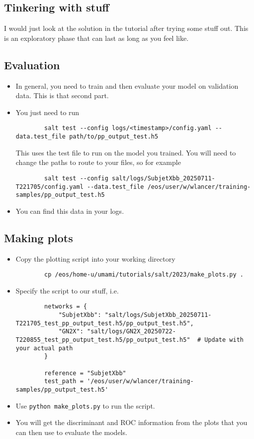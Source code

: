 \documentclass[11pt]{article}
\begin{document}
\subsection{Tinkering with stuff}

I would just look at the solution in the tutorial after trying 
some stuff out. This is an exploratory phase that can last as long
as you feel like.

\subsection{Evaluation}

\begin{itemize}
    \item In general, you need to train and then evaluate your model on validation
    data. This is that second part.
    \item You just need to run
    \begin{verbatim}
        salt test --config logs/<timestamp>/config.yaml --data.test_file path/to/pp_output_test.h5
    \end{verbatim}
    This uses the test file to run on the model you trained. You will
    need to change the paths to route to your files, so for example
    \begin{verbatim}
        salt test --config salt/logs/SubjetXbb_20250711-T221705/config.yaml --data.test_file /eos/user/w/wlancer/training-samples/pp_output_test.h5
    \end{verbatim}
    \item You can find this data in your logs.
\end{itemize}

\subsection{Making plots}

\begin{itemize}
    \item Copy the plotting script into your working directory
    \begin{verbatim}
        cp /eos/home-u/umami/tutorials/salt/2023/make_plots.py .
    \end{verbatim}
    \item Specify the script to our stuff, i.e.
    \begin{verbatim}
        networks = {
            "SubjetXbb": "salt/logs/SubjetXbb_20250711-T221705_test_pp_output_test.h5/pp_output_test.h5",
            "GN2X": "salt/logs/GN2X_20250722-T220855_test_pp_output_test.h5/pp_output_test.h5"  # Update with your actual path
        }   

        reference = "SubjetXbb"
        test_path = '/eos/user/w/wlancer/training-samples/pp_output_test.h5'
    \end{verbatim}
    \item Use \verb|python make_plots.py| to run the script.
    \item You will get the discriminant and ROC information from the
    plots that you can then use to evaluate the models.
\end{itemize}
\end{document}
